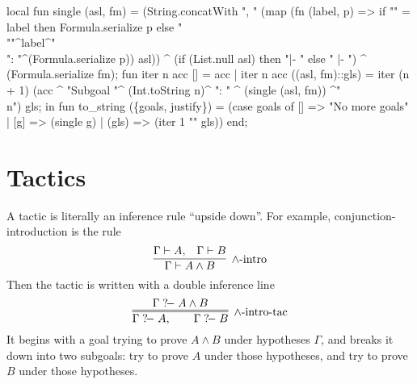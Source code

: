 \nwenddocs{}\endmoddef\nwstartdeflinemarkup{}\nwenddeflinemarkup
local
  fun single (asl, fm) =
    (String.concatWith
       ", "
       (map (fn (label, p) =>
                if "" = label then Formula.serialize p
                else "\\""^label^"\\": "^(Formula.serialize p))
            asl)) ^
    (if (List.null asl) then "|- "
     else " |- ") ^ 
    (Formula.serialize fm);
  fun iter n acc [] = acc
    | iter n acc ((asl, fm)::gls) =
        iter (n + 1)
             (acc ^
              "Subgoal "^
              (Int.toString n)^
              ": " ^
              (single (asl, fm)) ^"\\n")
             gls;
in
fun to_string (\{goals, justify\}) =
 (case goals of
   [] => "No more goals"
 | [g] => (single g)
 | (gls) => (iter 1 "" gls))
end;
\eatline
{}\nwendcode{}\nwdocspar
\section{Tactics}

\begin{node}
A tactic is literally an inference rule ``upside down''. For example,
conjunction-introduction is the rule
\begin{equation}
\vcenter{\infer[\land\mbox{-intro}]{\Gamma\vdash A\land B}{\Gamma\vdash A, & \Gamma\vdash B}}
\end{equation}
Then the tactic is written with a double inference line
\begin{equation}
\vcenter{\infer=[\land\mbox{-intro-tac}]{\Gamma\gdash A, \qquad \Gamma\gdash B}{\Gamma\gdash A\land B}}
\end{equation}
It begins with a goal trying to prove $A\land B$ under hypotheses
$\Gamma$, and breaks it down into two subgoals: try to prove $A$ under
those hypotheses, and try to prove $B$ under those hypotheses.
\end{node}

